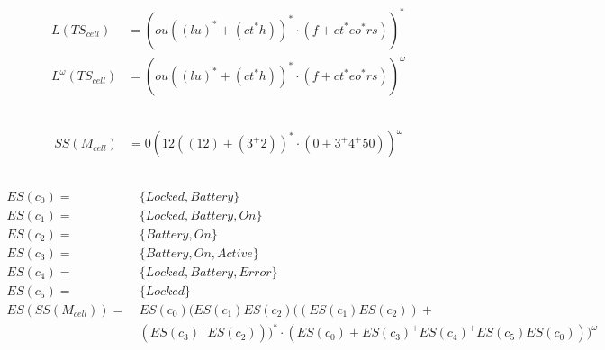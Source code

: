 \documentclass[12pt,a4paper]{../krautsourcing/homework}
\author{Ruben Felgenhauer,\\Alexander Hildebrandt,\\Leonhard Reichenbach}
\newcommand{\TScell}{TS_\textit{cell}}
\newcommand{\Mcell}{M_\textit{cell}}
\newcommand{\eLocked}{\textit{Locked}}
\newcommand{\eBattery}{\textit{Battery}}
\newcommand{\eOn}{\textit{On}}
\newcommand{\eActive}{\textit{Active}}
\newcommand{\eError}{\textit{Error}}
\begin{document}
\makeheadline

\addtocounter{section}{2}

\section{}

\subsection{}

\begin{align*}
	L(\TScell) &= (ou((lu)^* + (c t^* h))^* \cdot (f + c t^* e o^* r s))^*
	\\
	L^\omega(\TScell) &= (ou((lu)^* + (c t^* h))^* \cdot (f + c t^* e o^* r s))^\omega
\end{align*}

\subsection{}

\begin{align*}
	SS(\Mcell) &= 0(12((12)+(3^+2))^* \cdot (0 + 3^+4^+50))^\omega
\end{align*}

\subsection{}

\begin{align*}
	ES(c_0) =&\ \{\eLocked,\eBattery\}\\
	ES(c_1) =&\ \{\eLocked,\eBattery,\eOn\}\\
	ES(c_2) =&\ \{\eBattery,\eOn\}\\
	ES(c_3) =&\ \{\eBattery,\eOn,\eActive\}\\
	ES(c_4) =&\ \{\eLocked,\eBattery,\eError\}\\
	ES(c_5) =&\ \{\eLocked\}\\
	ES(SS(\Mcell)) =&\ ES(c_0)(ES(c_1)ES(c_2)((ES(c_1)ES(c_2))+\\&\ (ES(c_3)^+ES(c_2)))^* \cdot (ES(c_0) + ES(c_3)^+ES(c_4)^+ES(c_5)ES(c_0)))^\omega
\end{align*}

\subsection{}
\end{document}
